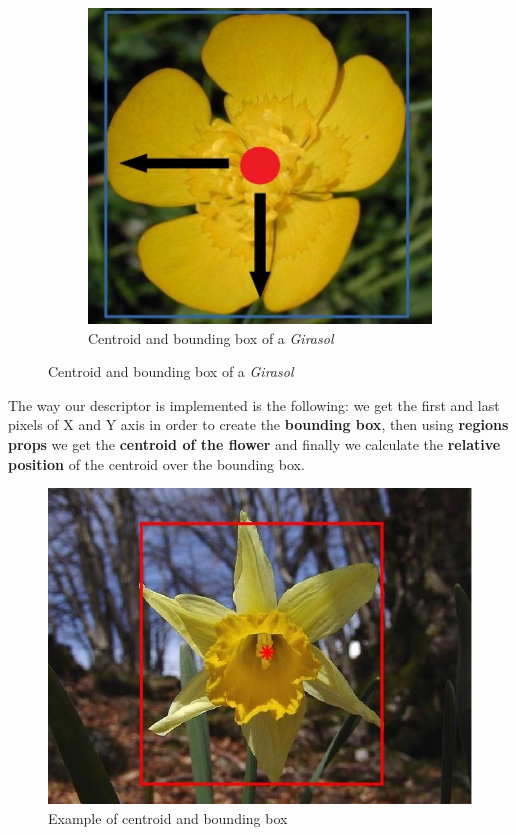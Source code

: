 \documentclass[11]{article}
\begin{document}
\begin{figure}[H]
    \begin{subfigure}[t]{0.45\textwidth}
    \centering
    \includegraphics[scale=0.2]{images/GirasolCentroid.jpg}
    \caption{Centroid and bounding box of a \textit{Girasol}}
    \label{centroidgirasol}
    \end{subfigure}
\end{figure}

The way our descriptor is implemented is the following: we get the first and last pixels of X and Y axis in order to create the \textbf{bounding box}, then using \textbf{regions props} we get the \textbf{centroid of the flower} and finally we calculate the \textbf{relative position} of the centroid over the bounding box. 
\medskip

\begin{figure}[H]
	\centering
	\includegraphics[scale=0.35]{images/centroid.jpg}
	\caption{Example of centroid and bounding box}
	\label{centroidNarcis}
\end{figure}
\end{document}
